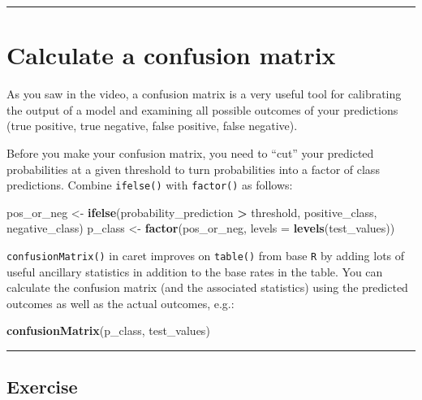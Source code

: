 \documentclass[
]{book}
\newenvironment{Shaded}{\begin{snugshade}}{\end{snugshade}}
\newcommand{\DataTypeTok}[1]{\textcolor[rgb]{0.13,0.29,0.53}{#1}}
\newcommand{\KeywordTok}[1]{\textcolor[rgb]{0.13,0.29,0.53}{\textbf{#1}}}
\newcommand{\NormalTok}[1]{#1}
\newcommand{\OperatorTok}[1]{\textcolor[rgb]{0.81,0.36,0.00}{\textbf{#1}}}
\newcommand{\StringTok}[1]{\textcolor[rgb]{0.31,0.60,0.02}{#1}}
\begin{document}
\begin{center}\rule{0.5\linewidth}{0.5pt}\end{center}

\hypertarget{calculate-a-confusion-matrix}{%
\section{Calculate a confusion matrix}\label{calculate-a-confusion-matrix}}

As you saw in the video, a confusion matrix is a very useful tool for calibrating the output of a model and examining all possible outcomes of your predictions (true positive, true negative, false positive, false negative).

Before you make your confusion matrix, you need to ``cut'' your predicted probabilities at a given threshold to turn probabilities into a factor of class predictions. Combine \texttt{ifelse()} with \texttt{factor()} as follows:

\begin{Shaded}
\begin{Highlighting}[]
\NormalTok{pos_or_neg <-}\StringTok{ }\KeywordTok{ifelse}\NormalTok{(probability_prediction }\OperatorTok{>}\StringTok{ }\NormalTok{threshold, positive_class, negative_class)}
\NormalTok{p_class <-}\StringTok{ }\KeywordTok{factor}\NormalTok{(pos_or_neg, }\DataTypeTok{levels =} \KeywordTok{levels}\NormalTok{(test_values))}
\end{Highlighting}
\end{Shaded}

\texttt{confusionMatrix()} in caret improves on \texttt{table()} from base \texttt{R} by adding lots of useful ancillary statistics in addition to the base rates in the table. You can calculate the confusion matrix (and the associated statistics) using the predicted outcomes as well as the actual outcomes, e.g.:

\begin{Shaded}
\begin{Highlighting}[]
\KeywordTok{confusionMatrix}\NormalTok{(p_class, test_values)}
\end{Highlighting}
\end{Shaded}

\begin{center}\rule{0.5\linewidth}{0.5pt}\end{center}

\hypertarget{exercise-11}{%
\subsection*{Exercise}\label{exercise-11}}
\end{document}
